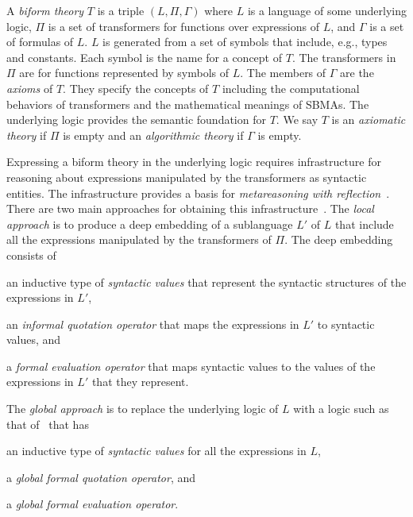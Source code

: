 \documentclass[fleqn]{llncs}
\begin{document}
A \emph{biform theory} $T$ is a triple $(L,\Pi,\Gamma)$ where $L$ is a
language of some underlying logic, $\Pi$ is a set of transformers for
functions over expressions of $L$, and $\Gamma$ is a set of formulas
of $L$.  $L$ is generated from a set of symbols that include, e.g.,
types and constants.  Each symbol is the name for a concept of $T$.
The transformers in $\Pi$ are for functions represented by symbols of
$L$.  The members of $\Gamma$ are the \emph{axioms} of $T$.  They
specify the concepts of $T$ including the computational behaviors of
transformers and the mathematical meanings of SBMAs.  The underlying
logic provides the semantic foundation for $T$.  We say $T$ is an
\emph{axiomatic theory} if $\Pi$ is empty and an \emph{algorithmic
 theory} if $\Gamma$ is empty.

Expressing a biform theory in the underlying logic requires infrastructure for
reasoning about expressions manipulated by the transformers as syntactic
entities.  The infrastructure provides a basis for \emph{metareasoning
 with reflection}~\cite{FarmerArxiv16}.
There are two main approaches for obtaining this
infrastructure~\cite{Farmer13}.  The \emph{local approach} is to
produce a deep embedding of a sublanguage $L'$ of $L$ that include all
the expressions manipulated by the transformers of $\Pi$.  The deep
embedding consists of 
\begin{enumerate*}[label=(\arabic*)]
\item an inductive type of \emph{syntactic values}
that represent the syntactic structures of the expressions in $L'$,
\item an \emph{informal quotation operator} that maps the expressions in
$L'$ to syntactic values, and 
\item a \emph{formal evaluation operator}
that maps syntactic values to the values of the expressions in $L'$
that they represent.
\end{enumerate*}
The \emph{global approach} is to replace the underlying logic of $L$
with a logic such as that of~\cite{FarmerArxiv16} that has
\begin{enumerate*}[label=(\arabic*)]
\item an inductive type of \emph{syntactic values} for all the
expressions in $L$, 
\item a \emph{global formal quotation operator}, and
\item a \emph{global formal evaluation operator}.
\end{enumerate*}
\end{document}
